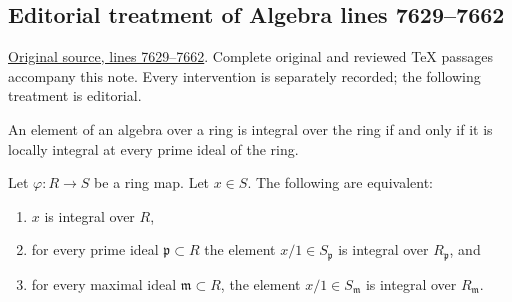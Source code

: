 \subsection{Editorial treatment of Algebra lines 7629--7662}

\hypertarget{algebra-context-076}{}

\noindent\href{https://github.com/stacks/stacks-project/blob/a04446e57ec1fbc252a871afcec7752fb2807b14/algebra.tex\#L7629}{Original source, lines 7629--7662}. Complete original and reviewed TeX passages accompany this note. Every intervention is separately recorded; the following treatment is editorial.


\begin{lemma}
\label{editorial-source-lemma-integral-closure-stalks}
\begin{slogan}
An element of an algebra over a ring is integral over the ring
if and only if it is locally integral at every prime ideal of the ring.
\end{slogan}
Let $\varphi : R \to S$ be a ring map.
Let $x \in S$. The following are equivalent:
\begin{enumerate}
\item $x$ is integral over $R$,
\item for every prime ideal $\mathfrak p \subset R$ the element
$x/1\in S_{\mathfrak p}$ is integral over $R_{\mathfrak p}$, and
\item for every maximal ideal $\mathfrak m\subset R$, the element
$x/1\in S_{\mathfrak m}$ is integral over $R_{\mathfrak m}$.
\end{enumerate}
\end{lemma}

